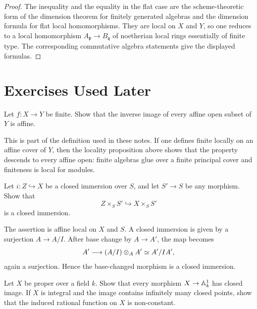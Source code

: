 \begin{proof}
The inequality and the equality in the flat case are the scheme-theoretic form
of the dimension theorem for finitely generated algebras and the dimension
formula for flat local homomorphisms.  They are local on \(X\) and \(Y\), so one
reduces to a local homomorphism \(A_{\mathfrak p}\to B_{\mathfrak q}\) of
noetherian local rings essentially of finite type.  The corresponding
commutative algebra statements give the displayed formulas.
\end{proof}

\section{Exercises Used Later}

\begin{exercise}\label{ex:finite-affine}
Let \(f:X\to Y\) be finite.  Show that the inverse image of every affine open
subset of \(Y\) is affine.
\end{exercise}

\begin{solution}
This is part of the definition used in these notes.  If one defines finite
locally on an affine cover of \(Y\), then the locality proposition above shows
that the property descends to every affine open: finite algebras glue over a
finite principal cover and finiteness is local for modules.
\end{solution}

\begin{exercise}\label{ex:fiber-closed-immersion}
Let \(i:Z\hookrightarrow X\) be a closed immersion over \(S\), and let
\(S'\to S\) be any morphism.  Show that
\[
    Z\times_S S'\hookrightarrow X\times_S S'
\]
is a closed immersion.
\end{exercise}

\begin{solution}
The assertion is affine local on \(X\) and \(S\).  A closed immersion is given
by a surjection \(A\to A/I\).  After base change by \(A\to A'\), the map becomes
\[
    A'\longrightarrow (A/I)\tensor_A A'\simeq A'/IA',
\]
again a surjection.  Hence the base-changed morphism is a closed immersion.
\end{solution}

\begin{exercise}\label{ex:proper-affine-functions}
Let \(X\) be proper over a field \(k\).  Show that every morphism
\(X\to\AA^1_k\) has closed image.  If \(X\) is integral and the image contains
infinitely many closed points, show that the induced rational function on \(X\)
is non-constant.
\end{exercise}

